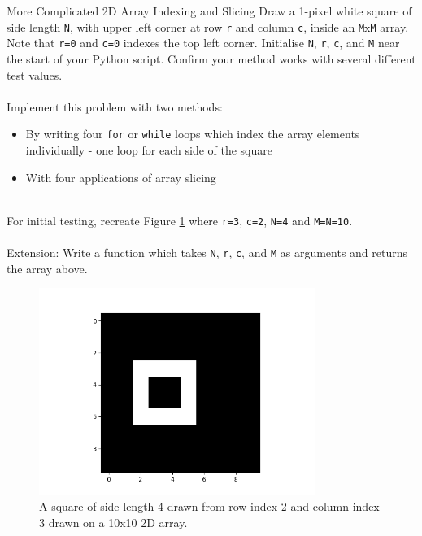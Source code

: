 \documentclass{lab}
\begin{document}
\begin{task}{More Complicated 2D Array Indexing and Slicing}{}
Draw a 1-pixel white square of side length \texttt{N}, with upper left corner at row \texttt{r} and column \texttt{c}, inside an \texttt{M}x\texttt{M} array. Note that \texttt{r=0} and \texttt{c=0} indexes the top left corner. Initialise \texttt{N}, \texttt{r}, \texttt{c}, and \texttt{M} near the start of your Python script. Confirm your method works with several different test values.
\\~\\
Implement this problem with two methods:
\begin{itemize}
	\item By writing four \texttt{for} or \texttt{while} loops which index the array elements individually - one loop for each side of the square
	\item With four applications of array slicing
\end{itemize}
~\\
For initial testing, recreate Figure \ref{fig:square} where \texttt{r=3}, \texttt{c=2}, \texttt{N=4} and \texttt{M=N=10}.
\\~\\
Extension: Write a function which takes \texttt{N}, \texttt{r}, \texttt{c}, and \texttt{M} as arguments and returns the array above.
\begin{figure}[H]
\begin{center}
\includegraphics[width=0.8\textwidth]{square.png}
\end{center}
\caption{A square of side length 4 drawn from row index 2 and column index 3 drawn on a 10x10 2D array.}\label{fig:square}
\end{figure}
\end{task}
\end{document}
